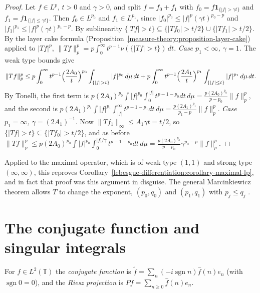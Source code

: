 \begin{proof}
Let $f \in L^p$, $t > 0$ and $\gamma > 0$, and split $f = f_0 + f_1$ with $f_0 = f\mathbf{1}_{\{|f| > \gamma t\}}$ and $f_1 = f\mathbf{1}_{\{|f| \leq \gamma t\}}$. Then $f_0 \in L^{p_0}$ and $f_1 \in L^{p_1}$, since
$|f_0|^{p_0} \leq |f|^p(\gamma t)^{p_0 - p}$ and $|f_1|^{p_1} \leq |f|^p(\gamma t)^{p_1 - p}$. By sublinearity $\{|Tf| > t\} \subseteq \{|Tf_0| > t/2\} \cup \{|Tf_1| > t/2\}$. By the layer cake formula
(Proposition~\ref{measure-theory:proposition-layer-cake}) applied to $|Tf|^p$, $\|Tf\|_p^p = p\int_0^\infty t^{p-1}\nu(\{|Tf| > t\})\,dt$.
\emph{Case $p_1 < \infty$, $\gamma = 1$.} The weak type bounds give
\[
\|Tf\|_p^p \leq p\int_0^\infty t^{p-1}\Bigl(\frac{2A_0}{t}\Bigr)^{p_0}\int_{\{|f| > t\}}|f|^{p_0}\,d\mu\,dt + p\int_0^\infty t^{p-1}\Bigl(\frac{2A_1}{t}\Bigr)^{p_1}\int_{\{|f| \leq t\}}|f|^{p_1}\,d\mu\,dt.
\]
By Tonelli, the first term is $p(2A_0)^{p_0}\int|f|^{p_0}\int_0^{|f|}t^{p-1-p_0}dt\,d\mu = \frac{p(2A_0)^{p_0}}{p - p_0}\|f\|_p^p$, and the second is
$p(2A_1)^{p_1}\int|f|^{p_1}\int_{|f|}^\infty t^{p-1-p_1}dt\,d\mu = \frac{p(2A_1)^{p_1}}{p_1 - p}\|f\|_p^p$.
\emph{Case $p_1 = \infty$, $\gamma = (2A_1)^{-1}$.} Now $\|Tf_1\|_\infty \leq A_1\gamma t = t/2$, so $\{|Tf| > t\} \subseteq \{|Tf_0| > t/2\}$, and as before
$\|Tf\|_p^p \leq p(2A_0)^{p_0}\int|f|^{p_0}\int_0^{|f|/\gamma}t^{p-1-p_0}dt\,d\mu = \frac{p(2A_0)^{p_0}}{p - p_0}\gamma^{p_0 - p}\|f\|_p^p$.
\end{proof}

Applied to the maximal operator, which is of weak type $(1, 1)$ and strong type $(\infty, \infty)$, this reproves Corollary~\ref{lebesgue-differentiation:corollary-maximal-lp}, and in fact that proof was this argument in
disguise. The general Marcinkiewicz theorem allows $T$ to change the exponent, $(p_0, q_0)$ and $(p_1, q_1)$ with $p_j \leq q_j$ \cite{grafakos-classical}.

\section{The conjugate function and singular integrals}\label{harmonic-analysis:section-conjugate}

\begin{definition}\label{harmonic-analysis:definition-conjugate}
For $f \in L^2(\mathbb{T})$ the \emph{conjugate function} is $\tilde f = \sum_n(-i\operatorname{sgn}n)\hat f(n)e_n$ (with $\operatorname{sgn}0 = 0$), and the \emph{Riesz projection} is $Pf = \sum_{n \geq 0}\hat f(n)e_n$.
\end{definition}

